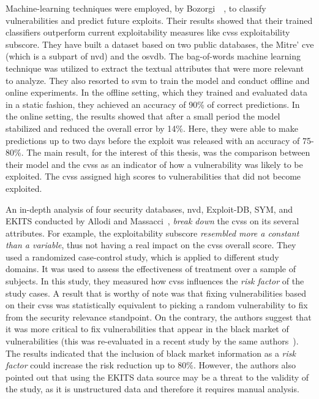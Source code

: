 Machine-learning techniques were employed, by Bozorgi~\etal{}~\cite{Bozorgi:2010}, to classify vulnerabilities and predict future exploits.
Their results showed that their trained classifiers outperform current exploitability measures like \gls{cvss} exploitability subscore.
They have built a dataset based on two public databases, the Mitre' \gls{cve} (which is a subpart of \gls{nvd}) and the \gls{osvdb}.
The bag-of-words machine learning technique was utilized to extract the textual attributes that were more relevant to analyze.
They also resorted to \gls{svm} to train the model and conduct offline and online experiments.
In the offline setting, which they trained and evaluated data in a static fashion, they achieved an accuracy of 90\% of correct predictions.
In the online setting, the results showed that after a small period the model stabilized and reduced the overall error by 14\%.
Here, they were able to make predictions up to two days before the exploit was released with an accuracy of 75-80\%.
The main result, for the interest of this thesis, was the comparison between their model and the \gls{cvss} as an indicator of how a vulnerability was likely to be exploited.
The \gls{cvss} assigned high scores to vulnerabilities that did not become exploited. 


An in-depth analysis of four security databases, \gls{nvd}, Exploit-DB, SYM, and EKITS conducted by Allodi and Massacci~\cite{Allodi:2014}, \emph{break down} the \gls{cvss} on its several attributes.
For example, the exploitability subscore \emph{resembled more a constant than a variable}, thus not having a real impact on the \gls{cvss} overall score.
They used a randomized case-control study, which is applied to different study domains.
It was used to assess the effectiveness of treatment over a sample of subjects.
In this study, they measured how \gls{cvss} influences the \emph{risk factor} of the study cases.
A result that is worthy of note was that fixing vulnerabilities based on their \gls{cvss} was statistically equivalent to picking a random vulnerability to fix from the security relevance standpoint.
On the contrary, the authors suggest that it was more critical to fix vulnerabilities that appear in the black market of vulnerabilities (this was re-evaluated in a recent study by the same authors~\cite{Allodi:2017}).
The results indicated that the inclusion of black market information as a \emph{risk factor} could increase the risk reduction up to 80\%.
However, the authors also pointed out that using the EKITS data source may be a threat to the validity of the study, as it is unstructured data and therefore it requires manual analysis.



